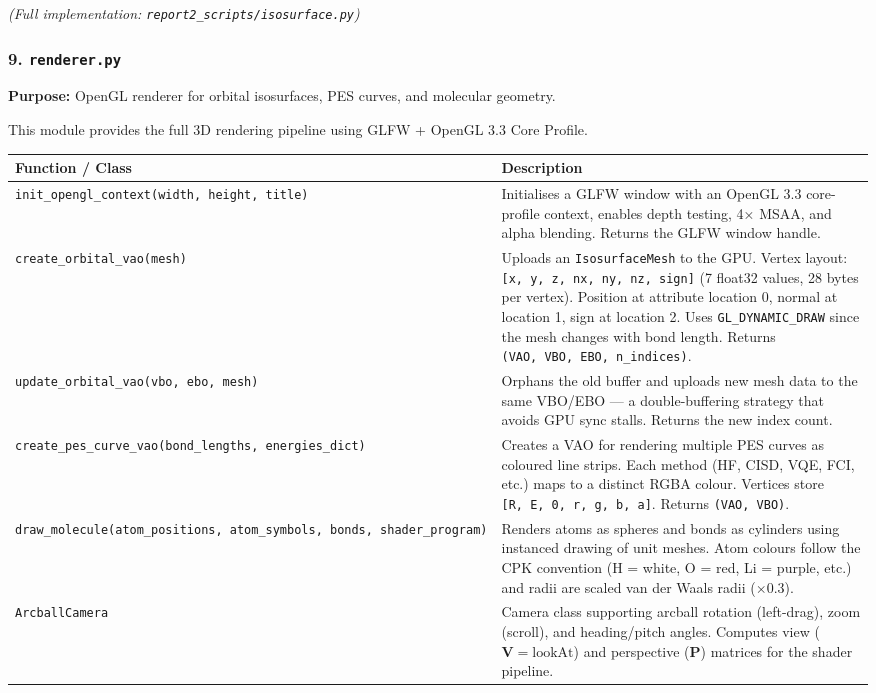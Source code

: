 \documentclass[
  11pt,
]{report}
\newcounter{none} %
\begin{document}
\emph{(Full implementation: \texttt{report2\_scripts/isosurface.py})}

\subsubsection{\texorpdfstring{9.
\texttt{renderer.py}}{9. renderer.py}}\label{renderer.py}

\textbf{Purpose:} OpenGL renderer for orbital isosurfaces, PES curves,
and molecular geometry.

This module provides the full 3D rendering pipeline using GLFW + OpenGL
3.3 Core Profile.

{\def\LTcaptype{none} %
\begin{longtable}[]{@{}
  >{\raggedright\arraybackslash}p{}
  >{\raggedright\arraybackslash}p{}@{}}
\toprule\noalign{}
\begin{minipage}[b]{\linewidth}\raggedright
Function / Class
\end{minipage} & \begin{minipage}[b]{\linewidth}\raggedright
Description
\end{minipage} \\
\midrule\noalign{}
\endhead
\bottomrule\noalign{}
\endlastfoot
\texttt{init\_opengl\_context(width,\ height,\ title)} & Initialises a
GLFW window with an OpenGL 3.3 core-profile context, enables depth
testing, 4× MSAA, and alpha blending. Returns the GLFW window handle. \\
\texttt{create\_orbital\_vao(mesh)} & Uploads an \texttt{IsosurfaceMesh}
to the GPU. Vertex layout:
\texttt{{[}x,\ y,\ z,\ nx,\ ny,\ nz,\ sign{]}} (7 float32 values, 28
bytes per vertex). Position at attribute location 0, normal at location
1, sign at location 2. Uses \texttt{GL\_DYNAMIC\_DRAW} since the mesh
changes with bond length. Returns
\texttt{(VAO,\ VBO,\ EBO,\ n\_indices)}. \\
\texttt{update\_orbital\_vao(vbo,\ ebo,\ mesh)} & Orphans the old buffer
and uploads new mesh data to the same VBO/EBO --- a double-buffering
strategy that avoids GPU sync stalls. Returns the new index count. \\
\texttt{create\_pes\_curve\_vao(bond\_lengths,\ energies\_dict)} &
Creates a VAO for rendering multiple PES curves as coloured line strips.
Each method (HF, CISD, VQE, FCI, etc.) maps to a distinct RGBA colour.
Vertices store \texttt{{[}R,\ E,\ 0,\ r,\ g,\ b,\ a{]}}. Returns
\texttt{(VAO,\ VBO)}. \\
\texttt{draw\_molecule(atom\_positions,\ atom\_symbols,\ bonds,\ shader\_program)}
& Renders atoms as spheres and bonds as cylinders using instanced
drawing of unit meshes. Atom colours follow the CPK convention (H =
white, O = red, Li = purple, etc.) and radii are scaled van der Waals
radii (\(\times 0.3\)). \\
\texttt{ArcballCamera} & Camera class supporting arcball rotation
(left-drag), zoom (scroll), and heading/pitch angles. Computes view
(\(\mathbf{V} = \text{lookAt}\)) and perspective (\(\mathbf{P}\))
matrices for the shader pipeline. \\
\end{longtable}
}
\end{document}

